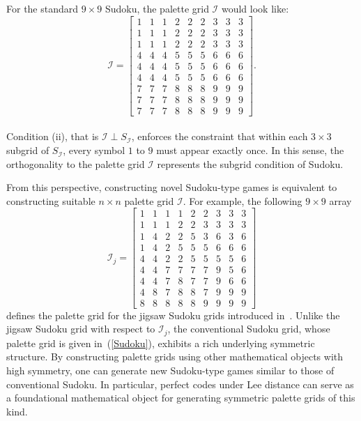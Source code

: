 \documentclass{article}
\theoremstyle{definition}
\begin{document}
For the standard $9 \times 9$ Sudoku, the palette grid $\mathcal{I}$ would look like:
{\small{
\begin{equation}\label{Sudoku}
\mathcal{I}  = \begin{bmatrix}
1 & 1 & 1 & 2 & 2 & 2 & 3 & 3 & 3 \\
1 & 1 & 1 & 2 & 2 & 2 & 3 & 3 & 3 \\
1 & 1 & 1 & 2 & 2 & 2 & 3 & 3 & 3 \\
4 & 4 & 4 & 5 & 5 & 5 & 6 & 6 & 6 \\
4 & 4 & 4 & 5 & 5 & 5 & 6 & 6 & 6 \\
4 & 4 & 4 & 5 & 5 & 5 & 6 & 6 & 6 \\
7 & 7 & 7 & 8 & 8 & 8 & 9 & 9 & 9 \\
7 & 7 & 7 & 8 & 8 & 8 & 9 & 9 & 9 \\
7 & 7 & 7 & 8 & 8 & 8 & 9 & 9 & 9
\end{bmatrix}.
\end{equation}
}}
\\
Condition (ii), that is $\mathcal{I}\perp S_\mathcal{I}$, enforces the constraint that within each $3\times 3$ subgrid of $S_\mathcal{I}$, every symbol $1$ to $9$ must appear exactly once. In this sense, the orthogonality to the palette grid $\mathcal{I}$ represents the subgrid condition of Sudoku.

From this perspective, constructing novel Sudoku-type games is equivalent to constructing suitable $n\times n$ palette grid $\mathcal{I}$. For example, the following $9\times 9$ array
{\small{
\[
\mathcal{I}_{j}=\begin{bmatrix}
1 & 1 & 1 & 1 & 2 & 2 & 3 & 3 & 3 \\
1 & 1 & 1 & 2 & 2 & 3 & 3 & 3 & 3 \\
1 & 4 & 2 & 2 & 5 & 3 & 6 & 3 & 6 \\
1 & 4 & 2 & 5 & 5 & 5 & 6 & 6 & 6 \\
4 & 4 & 2 & 2 & 5 & 5 & 5 & 5 & 6 \\
4 & 4 & 7 & 7 & 7 & 7 & 9 & 5 & 6 \\
4 & 4 & 7 & 8 & 7 & 7 & 9 & 6 & 6 \\
4 & 8 & 7 & 8 & 8 & 7 & 9 & 9 & 9 \\
8 & 8 & 8 & 8 & 8 & 9 & 9 & 9 & 9
\end{bmatrix}
\]
}}
defines the palette grid for the jigsaw Sudoku grids introduced in~\cite{L18}. Unlike the jigsaw Sudoku grid with respect to $\mathcal{I}_{j}$, the conventional Sudoku grid, whose palette grid is given in~(\ref{Sudoku}), exhibits a rich underlying symmetric structure. By constructing palette grids using other mathematical objects with high symmetry, one can generate new Sudoku-type games similar to those of conventional Sudoku. In particular, perfect codes under Lee distance can serve as a foundational mathematical object for generating symmetric palette grids of this kind.
\end{document}
